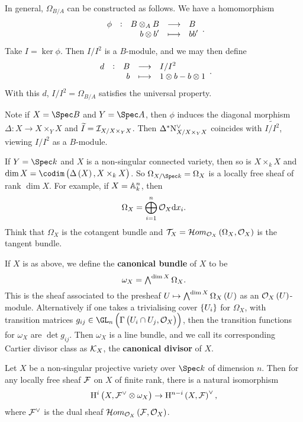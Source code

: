 \begin{remark*}
In general, $ \Omega_{B / A} $ can be constructed as follows. We have a homomorphism
$$ \function[\phi]{B \otimes_A B}{B}{b \otimes b'}{bb'}. $$
Take $ I = \ker \phi $. Then $ I / I^2 $ is a $ B $-module, and we may then define
$$ \function[d]{B}{I / I^2}{b}{1 \otimes b - b \otimes 1}. $$
With this $ d $, $ I / I^2 = \Omega_{B / A} $ satisfies the universal property.
\end{remark*}

Note if $ X = \Spec B $ and $ Y = \Spec A $, then $ \phi $ induces the diagonal morphism $ \Delta : X \to X \times_Y X $ and $ \widetilde{I} = \III_{X / X \times_Y X} $. Then $ \Delta^*\N_{X / X \times_Y X}^\vee $ coincides with $ \widetilde{I / I^2} $, viewing $ I / I^2 $ as a $ B $-module.

\begin{example*}
If $ Y = \Spec k $ and $ X $ is a non-singular connected variety, then so is $ X \times_k X $ and $ \dim X = \codim\br{\Delta\br{X}, X \times_k X} $. So $ \Omega_{X / \Spec k} = \Omega_X $ is a locally free sheaf of rank $ \dim X $. For example, if $ X = \AA_k^n $, then
$$ \Omega_X = \bigoplus_{i = 1}^n \OOO_X\d x_i. $$
Think that $ \Omega_X $ is the cotangent bundle and $ \TTT_X = \HOM_{\OOO_X}\br{\Omega_X, \OOO_X} $ is the tangent bundle.
\end{example*}

\begin{definition*}
If $ X $ is as above, we define the \textbf{canonical bundle} of $ X $ to be
$$ \omega_X = \ext^{\dim X}\Omega_X. $$
This is the sheaf associated to the presheaf $ U \mapsto \ext^{\dim X}\Omega_X\br{U} $ as an $ \OOO_X\br{U} $-module. Alternatively if one takes a trivialising cover $ \cbr{U_i} $ for $ \Omega_X $, with transition matrices $ g_{ij} \in \GL_n\br{\Gamma\br{U_i \cap U_j, \OOO_X}} $, then the transition functions for $ \omega_X $ are $ \det g_{ij} $. Then $ \omega_X $ is a line bundle, and we call its corresponding Cartier divisor class as $ \KKK_X $, the \textbf{canonical divisor} of $ X $.
\end{definition*}

\begin{theorem}
Let $ X $ be a non-singular projective variety over $ \Spec k $ of dimension $ n $. Then for any locally free sheaf $ \FFF $ on $ X $ of finite rank, there is a natural isomorphism
$$ \H^i\br{X, \FFF^\vee \otimes \omega_X} \to \H^{n - i}\br{X, \FFF}^\vee, $$
where $ \FFF^\vee $ is the dual sheaf $ \HOM_{\OOO_X}\br{\FFF, \OOO_X} $.
\end{theorem}

